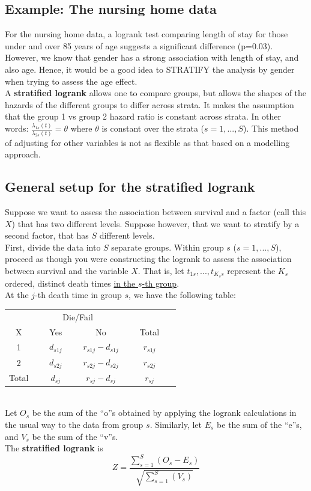 \documentclass[11pt,slidesonly,semrot,portrait,palatino]{book}
\begin{document}
{\subsection{Example: The nursing home data}
For the nursing home data, a logrank test comparing length of stay for those
under and over 85 years of age suggests a
significant difference (p=0.03).
\\[2ex]
However,  we know that gender has a strong association with
length of stay, and also age.   Hence,  it would be a
good idea to STRATIFY the analysis by gender when trying to
assess the age effect.
\\[2ex]
A {\bf stratified logrank} allows one to compare groups, but
allows the shapes of the hazards of the different
groups to differ  across strata.   It makes the assumption that
the group 1 vs group 2 hazard ratio is constant across strata.
In other words: $\frac{\lambda_{1s}(t)}{\lambda_{2s}(t)} = \theta$
where $\theta$ is constant over the strata ($s=1,...,S$).
This method of adjusting for other variables is not as flexible
as that based on a modelling approach.
\subsection{General setup for the stratified logrank}
Suppose we want to assess the association between survival
and a factor (call this $X$) that has two different levels.  Suppose
however, that we want to stratify by a second factor, that has $S$
different levels.
\\[2ex]
First, divide the data into $S$ separate groups.  Within
group $s$ ($s=1,...,S$), proceed as though you were constructing the logrank
to assess the association between survival and the variable $X$.  That
is, let  $t_{1s},...,t_{K_s s}$ represent the $K_s$ ordered, distinct death
times \underline{in the $s$-th group}.
\\[2ex]
At the $j$-th death time in group $s$, we have the following table:
\begin{center}
\begin{tabular}{cccc}
\hline \hline
& \multicolumn{2}{c}{Die/Fail} & \\ \cline{2-3}
\multicolumn{1}{c}{X} & ~~~Yes~~~ & ~~~No~~~ & ~~~Total~~~\\ \hline
1 & $d_{s1j}$ & $r_{s1j} - d_{s1j}$ & $r_{s1j}$ \\[2ex]
2 & $d_{s2j}$ & $r_{s2j} - d_{s2j}$ & $r_{s2j}$  \\
\hline
Total &  $d_{sj}  $ & $r_{sj}   - d_{sj}  $ & $r_{sj}  $  \\
\hline \hline
\end{tabular}
\end{center}
~\\[2ex]
Let $O_s$ be the sum of the ``o''s obtained by applying the
logrank calculations in the usual way to the data from group $s$.
Similarly, let  $E_s$ be the sum of the ``e''s, and
 $V_s$ be the sum of the ``v''s.
\\[2ex]
The  {\bf stratified logrank} is
\[  Z = \frac{\sum_{s=1}^{S} (O_s - E_s)}{\sqrt{\sum_{s=1}^{S} (V_s)}} \]
}
\end{document}
